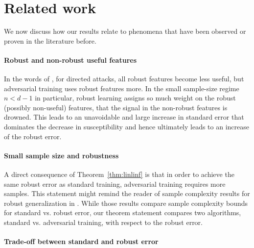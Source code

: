 \section{Related work}
\label{sec:relatedwork}

We now discuss how our results relate to phenomena that have been observed or proven in the literature before.

\paragraph{Robust and non-robust useful features}
In the words of \citet{ilyas19, springer21}, for
directed attacks, all robust features become less useful, but adversarial
training uses robust features more.  In the small sample-size regime
$n<d-1$ in particular, robust learning assigns so much weight
on the robust (possibly non-useful) features, that the signal in the non-robust
features is drowned. This leads to an unavoidable and large increase
in standard error that dominates the decrease in susceptibility and
hence ultimately leads to an increase of the robust error.

\paragraph{Small sample size and robustness}
A direct consequence of Theorem~\ref{thm:linlinf} is that in order to
achieve the same robust error as standard training, adversarial
training requires more samples. This statement might remind the reader
of sample complexity results for robust generalization in
\citet{schmidt18, Yin19, Khim18}. While those results compare sample
complexity bounds for standard vs. robust error, our theorem
statement compares two algorithms, standard vs. adversarial training,
with respect to the robust error.


\paragraph{Trade-off between standard and robust error} 

